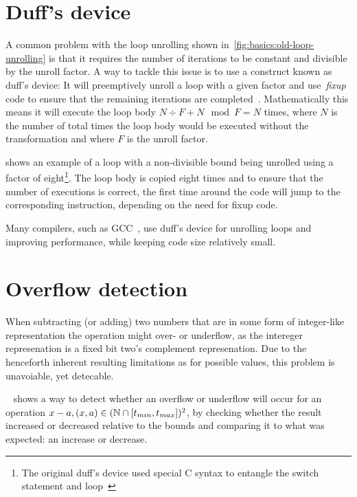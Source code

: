\section{Duff's device}\label{sec:basics:duffs}

A common problem with the loop unrolling shown in~\cref{fig:basics:old-loop-unrolling} is that it requires the number of iterations to be constant and divisible by the unroll factor.
A way to tackle this issue is to use a construct known as duff's device: It will preemptively unroll a loop with a given factor and use~\textit{fixup} code to ensure that the remaining iterations are completed~\cite{duff_1983}.
Mathematically this means it will execute the loop body $N \div F + N \mod F = N$ times, where $N$ is the number of total times the loop body would be executed without the transformation and where $F$ is the unroll factor.

 shows an example of a loop with a non-divisible bound being unrolled using a factor of eight\footnote{The original duff's device used special C syntax to entangle the switch statement and loop~\cite{duff_1983}}.
The loop body is copied eight times and to ensure that the number of executions is correct, the first time around the code will jump to the corresponding instruction, depending on the need for fixup code.

Many compilers, such as GCC~\cite{gcc}, use duff's device for unrolling loops and improving performance, while keeping code size relatively small.



\section{Overflow detection}\label{sec:basics:overflow}

When subtracting (or adding) two numbers that are in some form of integer-like representation the operation might over- or underflow, as the intereger represenation is a fixed bit two's complement represenation.
Due to the henceforth inherent resulting limitations as for possible values, this problem is unavoiable, yet detecable.

~\cite{pmg_2009} shows a way to detect whether an overflow or underflow will occur for an operation $x - a, (x, a) \in (\mathbb{N} \cap {\lbrack t_{min}, t_{max} \rbrack})^2$, by checking whether the result increased or decreased relative to the bounds and comparing it to what was expected: an increase or decrease.


